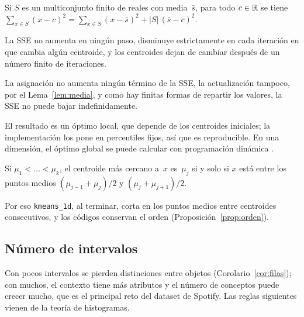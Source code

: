 \begin{lema}\label{lem:media}
Si $S$ es un multiconjunto finito de reales con media~$\bar{s}$, para todo $c \in \mathbb{R}$ se tiene $\sum_{x \in S} (x - c)^2 = \sum_{x \in S} (x - \bar{s})^2 + \lvert S \rvert \, (\bar{s} - c)^2$.
\end{lema}

\begin{teorema}\label{teo:lloyd}
La SSE no aumenta en ningún paso, disminuye estrictamente en cada iteración en que cambia algún centroide, y los centroides dejan de cambiar después de un número finito de iteraciones.
\end{teorema}

La asignación no aumenta ningún término de la SSE, la actualización tampoco, por el Lema~\ref{lem:media}, y como hay finitas formas de repartir los valores, la SSE no puede bajar indefinidamente.

\begin{observacion}\label{obs:optimo-local}
El resultado es un óptimo local, que depende de los centroides iniciales; la implementación los pone en percentiles fijos, así que es reproducible. En una dimensión, el óptimo global se puede calcular con programación dinámica \parencite{fisher1958, wang2011}.
\end{observacion}

\begin{proposicion}\label{prop:voronoi}
Si $\mu_1 < \dots < \mu_k$, el centroide más cercano a~$x$ es~$\mu_j$ si y solo si $x$ está entre los puntos medios $(\mu_{j-1} + \mu_j)/2$ y $(\mu_j + \mu_{j+1})/2$.
\end{proposicion}

Por eso \texttt{kmeans\_1d}, al terminar, corta en los puntos medios entre centroides consecutivos, y los códigos conservan el orden (Proposición~\ref{prop:orden}).


\subsection{Número de intervalos}
\label{sec:numero-intervalos}

Con pocos intervalos se pierden distinciones entre objetos (Corolario~\ref{cor:filas}); con muchos, el contexto tiene más atributos y el número de conceptos puede crecer mucho, que es el principal reto del dataset de Spotify. Las reglas siguientes vienen de la teoría de histogramas.


